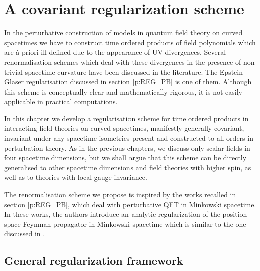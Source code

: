 \documentclass[11pt]{book}
\theoremstyle{break}
\begin{document}




\chapter{A covariant regularization scheme}
\label{p:COV_REG}


In the perturbative construction of models in quantum field theory on curved spacetimes we have to construct time ordered products of field polynomials which are à priori ill defined due to the appearance of UV divergences. Several renormalisation schemes which deal with these divergences in the presence of non trivial spacetime curvature have been discussed in the literature. The Epstein--Glaser regularisation discussed in section \ref{p:REG_PB} is one of them. Although this scheme is conceptually clear and mathematically rigorous, it is not easily applicable in practical computations. 


In this chapter we develop a regularisation scheme for time ordered products in interacting field theories on curved spacetimes, manifestly generally covariant, invariant under any spacetime isometries present and constructed to all orders in perturbation theory. As in the previous chapters, we discuss only scalar fields in four spacetime dimensions, but we shall argue that this scheme can be directly generalised to other spacetime dimensions and field theories with higher spin, as well as to theories with local gauge invariance. 


The renormalisation scheme we propose is inspired by the works \cite{keller_dimensional_2010,duetsch_dimensional_2014} recalled in section \ref{p:REG_PB}, which deal with perturbative QFT in Minkowski spacetime. In these works, the authors introduce an analytic regularization of the position space Feynman propagator in Minkowski spacetime which is similar to the one discussed in \cite{bollini_dimensional_2008}. 





\section{General regularization framework}
\end{document}
